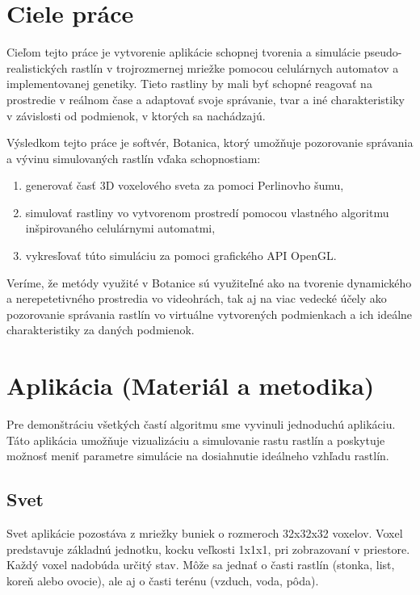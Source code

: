 \documentclass[12pt]{article}
\begin{document}
\section{Ciele práce}

Cieľom tejto práce je vytvorenie aplikácie schopnej tvorenia a simulácie
pseudo-rea\-listických rastlín v trojrozmernej mriežke pomocou celulárnych
automatov a implementovanej genetiky.
Tieto rastliny by mali byť schopné reagovať na prostredie v reálnom čase
a adaptovať svoje správanie, tvar a iné charakteristiky v závislosti
od podmienok, v ktorých sa nachádzajú.

Výsledkom tejto práce je softvér, Botanica, ktorý umožňuje pozorovanie
správania a vývinu simulovaných rastlín vďaka schopnostiam:

\begin{enumerate}
	\item generovať časť 3D voxelového sveta za pomoci Perlinovho šumu,
	\item simulovať rastliny vo vytvorenom prostredí pomocou vlastného
	      algoritmu inšpirovaného celulárnymi automatmi,
	\item vykresľovať túto simuláciu za pomoci grafického API OpenGL.
\end{enumerate}

Veríme, že metódy využité v Botanice sú využiteľné ako na tvorenie dynamického
a nerepetetivného prostredia vo videohrách, tak aj na viac vedecké účely
ako pozorovanie správania rastlín vo virtuálne vytvorených podmienkach
a ich ideálne charakteristiky za daných podmienok.


\section{Aplikácia (Materiál a metodika)}

Pre demonštráciu všetkých častí algoritmu sme vyvinuli jednoduchú aplikáciu.
Táto aplikácia umožňuje vizualizáciu a simulovanie rastu rastlín
a poskytuje možnosť meniť parametre simulácie na dosiahnutie ideálneho vzhľadu
rastlín.

\subsection{Svet} \label{subsec:svet}

Svet aplikácie pozostáva z mriežky buniek o rozmeroch 32x32x32 voxelov.
Voxel predstavuje základnú jednotku, kocku veľkosti 1x1x1, pri zobrazovaní v priestore.
Každý voxel nadobúda určitý stav. Môže sa jednať o časti rastlín (stonka, list,
koreň alebo ovocie), ale aj o časti terénu (vzduch, voda, pôda).
\end{document}
